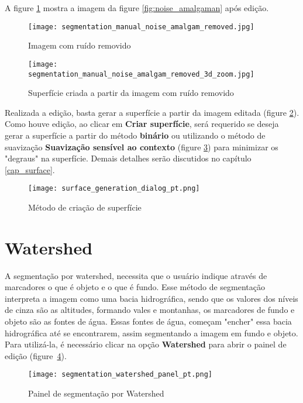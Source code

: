 A figure \ref{fig:editor_amalgaman} mostra a imagem da figure \ref{fig:noise_amalgaman} após
edição.

\begin{figure}[!htb]
\centering
\texttt{[image: segmentation\_manual\_noise\_amalgam\_removed.jpg]}
\caption{Imagem com ruído removido}
\label{fig:editor_amalgaman}
\end{figure}

\begin{figure}[!htb]
\centering
\texttt{[image: segmentation\_manual\_noise\_amalgam\_removed\_3d\_zoom.jpg]}
\caption{Superfície criada a partir da imagem com ruído removido}
\label{fig:surface_edited_amalgaman}
\end{figure}

\newpage
Realizada a edição, basta gerar a superfície a partir da imagem editada (figure
\ref{fig:surface_edited_amalgaman}). Como houve edição, ao clicar em \textbf{Criar superfície}, será
requerido se deseja gerar a superfície a partir do método \textbf{binário} ou utilizando o método de suavização
\textbf{Suavização sensível ao contexto} (figure \ref{fig:new_surface_edited}) para minimizar os "degraus" na superfície.
Demais detalhes serão discutidos no capítulo \ref{cap_surface}.

\begin{figure}[!htb]
\centering
\texttt{[image: surface\_generation\_dialog\_pt.png]}
\caption{Método de criação de superfície}
\label{fig:new_surface_edited}
\end{figure}


\section{Watershed}

A segmentação por watershed, necessita que o usuário indique através de marcadores o que é objeto e o que é fundo. Esse método de segmentação interpreta a imagem como uma bacia hidrográfica, sendo que os valores dos níveis de cinza são as altitudes, formando vales e montanhas, os marcadores de fundo e objeto são as fontes de água. Essas fontes de água, começam "encher" essa bacia hidrográfica até se encontrarem, assim segmentando a imagem em fundo e objeto. Para utilizá-la, é necessário clicar na opção \textbf{Watershed} para abrir o painel de edição (figure~\ref{fig:watershed_painel}).

\begin{figure}[!htb]
\centering
\texttt{[image: segmentation\_watershed\_panel\_pt.png]}
\caption{Painel de segmentação por Watershed}
\label{fig:watershed_painel}
\end{figure}

